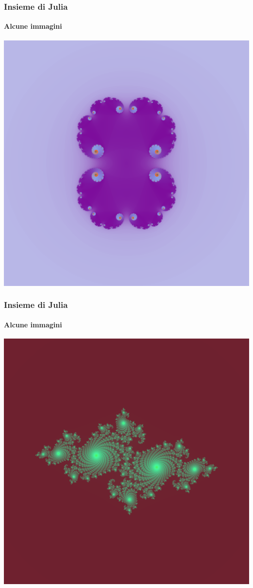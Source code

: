 \documentclass{beamer}
\begin{document}
			\begin{frame}
				\frametitle{Insieme di Julia}
				\framesubtitle{Alcune immagini}
				\begin{center}
					\includegraphics[width=0.7\linewidth]{"../Insieme di Julia/julia2"}
				\end{center}
			\end{frame}
			\begin{frame}
				\frametitle{Insieme di Julia}
				\framesubtitle{Alcune immagini}
				\begin{center}
					\includegraphics[width=0.7\linewidth]{"../Insieme di Julia/julia4"}
				\end{center}
			\end{frame}
\end{document}
